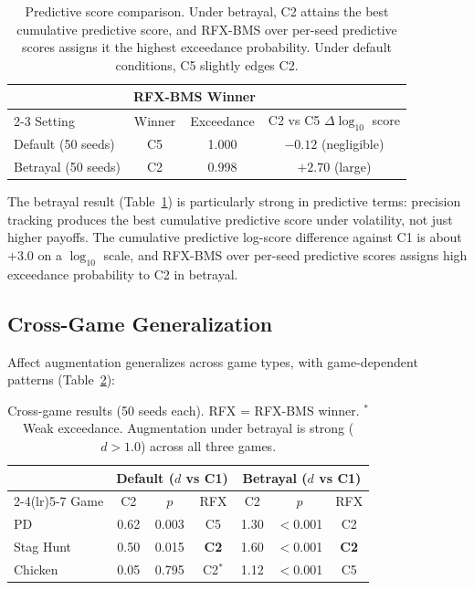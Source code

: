 \documentclass[11pt,a4paper]{article}
\begin{document}
\begin{table}[ht]
\centering\small
\begin{tabular}{lccc}
\toprule
& \multicolumn{2}{c}{RFX-BMS Winner} \\
\cmidrule(lr){2-3}
Setting & Winner & Exceedance & C2 vs C5 $\Delta \log_{10}$ score \\
\midrule
Default (50 seeds) & C5 & 1.000 & $-0.12$ (negligible) \\
Betrayal (50 seeds) & C2 & 0.998 & $+2.70$ (large) \\
\bottomrule
\end{tabular}
\caption{Predictive score comparison. Under betrayal, C2 attains the best cumulative predictive score, and RFX-BMS over per-seed predictive scores assigns it the highest exceedance probability. Under default conditions, C5 slightly edges C2.}
\label{tab:bms}
\end{table}

The betrayal result (Table~\ref{tab:bms}) is particularly strong in predictive terms: precision tracking produces the best cumulative predictive score under volatility, not just higher payoffs. The cumulative predictive log-score difference against C1 is about $+3.0$ on a $\log_{10}$ scale, and RFX-BMS over per-seed predictive scores assigns high exceedance probability to C2 in betrayal.

\subsection{Cross-Game Generalization}

Affect augmentation generalizes across game types, with game-dependent patterns (Table~\ref{tab:crossgame}):

\begin{table}[ht]
\centering\small
\begin{tabular}{lcccccc}
\toprule
& \multicolumn{3}{c}{Default ($d$ vs C1)} & \multicolumn{3}{c}{Betrayal ($d$ vs C1)} \\
\cmidrule(lr){2-4}\cmidrule(lr){5-7}
Game & C2 & $p$ & RFX & C2 & $p$ & RFX \\
\midrule
PD & 0.62 & 0.003 & C5 & 1.30 & $<$0.001 & C2 \\
Stag Hunt & 0.50 & 0.015 & \textbf{C2} & 1.60 & $<$0.001 & \textbf{C2} \\
Chicken & 0.05 & 0.795 & C2$^*$ & 1.12 & $<$0.001 & C5 \\
\bottomrule
\end{tabular}
\caption{Cross-game results (50 seeds each). RFX = RFX-BMS winner. $^*$Weak exceedance. Augmentation under betrayal is strong ($d > 1.0$) across all three games.}
\label{tab:crossgame}
\end{table}
\end{document}
